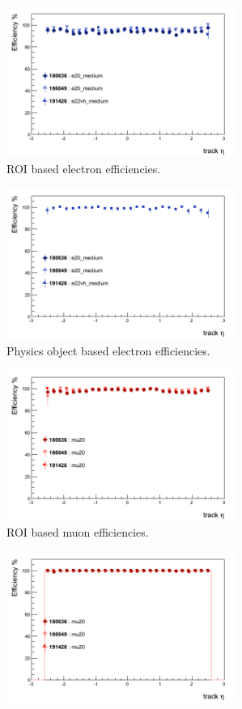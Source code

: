 \clearpage

\begin{figure}[htbp]
	\begin{subfigure}{.5\linewidth}
		\centering
		\includegraphics[width=75mm]{f/e20_medium_IDTrkNoCut_eta_EF_eff}
		\caption{ROI based electron efficiencies.}
		\label{fig:trig_2011_EF_eta_a}
	\end{subfigure}
	\begin{subfigure}{.5\linewidth}	
		\centering
		\includegraphics[width=75mm]{f/e20_medium_IDTrkNoCut_eta_EF_eff_comb}
		\caption{Physics object based electron efficiencies.}
		\label{fig:trig_2011_EF_eta_b}
	\end{subfigure}
	\begin{subfigure}{.5\linewidth}	
		\centering
		\includegraphics[width=75mm]{f/mu20_IDTrkNoCut_eta_EF_eff}
		\caption{ROI based muon efficiencies.}
		\label{fig:trig_2011_EF_eta_c}
	\end{subfigure}
	\begin{subfigure}{.5\linewidth}	
		\centering
		\includegraphics[width=75mm]{f/mu20_IDTrkNoCut_eta_EF_eff_comb}

\end{subfigure}
\end{figure}

